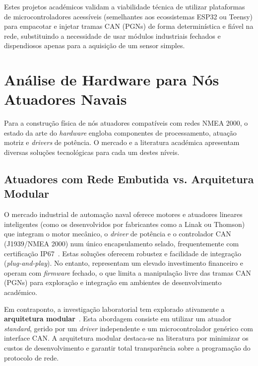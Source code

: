 Estes projetos académicos validam a viabilidade técnica de utilizar plataformas de microcontroladores acessíveis (semelhantes aos ecossistemas ESP32 ou Teensy) para empacotar e injetar tramas CAN (PGNs) de forma determinística e fiável na rede, substituindo a necessidade de usar módulos industriais fechados e dispendiosos apenas para a aquisição de um sensor simples.

\section{Análise de Hardware para Nós Atuadores Navais}
Para a construção física de nós atuadores compatíveis com redes NMEA 2000, o estado da arte do \textit{hardware} engloba componentes de processamento, atuação motriz e \textit{drivers} de potência. O mercado e a literatura académica apresentam diversas soluções tecnológicas para cada um destes níveis.

\subsection{Atuadores com Rede Embutida vs. Arquitetura Modular}
O mercado industrial de automação naval oferece motores e atuadores lineares inteligentes (como os desenvolvidos por fabricantes como a Linak ou Thomson) que integram o motor mecânico, o \textit{driver} de potência e o controlador CAN (J1939/NMEA 2000) num único encapsulamento selado, frequentemente com certificação IP67~\cite{linak_canbus}. Estas soluções oferecem robustez e facilidade de integração (\textit{plug-and-play}). No entanto, representam um elevado investimento financeiro e operam com \textit{firmware} fechado, o que limita a manipulação livre das tramas CAN (PGNs) para exploração e integração em ambientes de desenvolvimento académico.

Em contraponto, a investigação laboratorial tem explorado ativamente a \textbf{arquitetura modular}~\cite{ertogan2018marine, puig_rais_2011}. Esta abordagem consiste em utilizar um atuador \textit{standard}, gerido por um \textit{driver} independente e um microcontrolador genérico com interface CAN. A arquitetura modular destaca-se na literatura por minimizar os custos de desenvolvimento e garantir total transparência sobre a programação do protocolo de rede.

